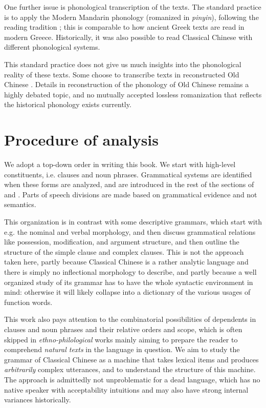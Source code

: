 \documentclass[UTF8, a4paper, oneside, scheme=plain, 12pt]{ctexrep}
\newcommand{\form}[1]{\emph{#1}}
\begin{document}
One further issue is phonological transcription of the texts.
The standard practice is to apply the Modern Mandarin phonology (romanized in \form{pinyin}),
following the reading tradition \citep{pulleyblank1995outline};
this is comparable to how ancient Greek texts are read in modern Greece.
Historically, it was also possible to read Classical Chinese with different phonological systems.

This standard practice does not give us much insights into the phonological reality of these texts.
Some choose to transcribe texts in reconstructed Old Chinese \citep{jacques2022nature}.
Details in reconstruction of the phonology of Old Chinese remains a highly debated topic,
and no mutually accepted lossless romanization that reflects the historical phonology exists currently.

\section{Procedure of analysis}

We adopt a top-down order in writing this book.
We start with high-level constituents, i.e. clauses and noun phrases.
Grammatical systems are identified when these forms are analyzed,
and are introduced in the rest of the sections of  and .
Parts of speech divisions are made based on grammatical evidence and not semantics.

This organization is in contrast with some descriptive grammars,
which start with e.g. the nominal and verbal morphology,
and then discuss grammatical relations like possession, modification, and argument structure,
and then outline the structure of the simple clause and complex clauses.
This is not the approach taken here,
partly because Classical Chinese is a rather analytic language and there is simply no inflectional morphology to describe,
and partly because a well organized study of its grammar has to have the whole syntactic environment in mind:
otherwise it will likely collapse into a dictionary of the various usages of function words.

This work also pays attention to the combinatorial possibilities of dependents in clauses and noun phrases and their relative orders and scope,
which is often skipped in \emph{ethno-philological} works mainly aiming to prepare the reader to comprehend \emph{natural texts} in the language in question.
We aim to study the grammar of Classical Chinese as a machine that takes lexical items and produces \emph{arbitrarily} complex utterances,
and to understand the structure of this machine.
The approach is admittedly not unproblematic for a dead language,
which has no native speaker with acceptability intuitions and may also have strong internal variances historically.
\end{document}

